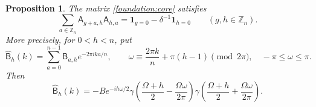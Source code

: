 \documentclass[11pt]{article}
\numberwithin{equation}{section}
\newtheorem{proposition}[theorem]{Proposition}
\theoremstyle{definition}
\theoremstyle{remark}
\begin{document}
\begin{proposition}\label{foundation:quadratics}
The matrix \eqref{foundation:core} satisfies
\begin{equation}\label{foundation:Q}
 \sum_{a\in\mathbb Z_n}\mathsf A_{g+a,h}\mathsf A_{h,a}
 =\mathbf1_{g=0}-\delta^{-1}\mathbf1_{h=0}
 \qquad(g,h\in\mathbb Z_n).
\end{equation}
More precisely, for $0<h<n$, put
\[
 \widehat{\mathsf B}_h(k)=\sum_{a=0}^{n-1}\mathsf B_{a,h}
              e^{-2\pi ika/n},\qquad
 \omega\equiv\frac{2\pi k}{n}+\pi(h-1)\pmod{2\pi},
 \quad -\pi\leq\omega\leq\pi.
\]
Then
\begin{equation}\label{fd:fourier}
 \widehat{\mathsf B}_h(k)
 =-B e^{-ih\omega/2}
   \gamma\left(\frac{\Omega+h}{2}-\frac{\Omega\omega}{2\pi}\right)
   \gamma\left(\frac{\Omega+h}{2}+\frac{\Omega\omega}{2\pi}\right).
\end{equation}
\end{proposition}
\end{document}
